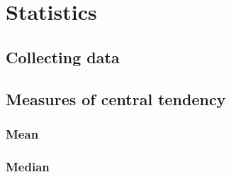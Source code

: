 \chapter{Statistics}
\section{Collecting data}
\section{Measures of central tendency}
\subsection{Mean}
\subsection{Median}
